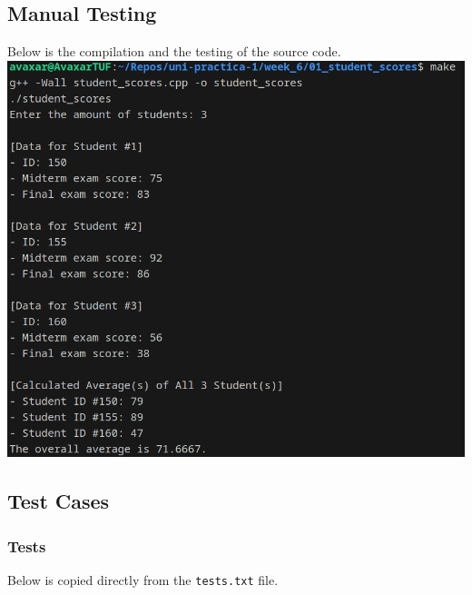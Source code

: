 \documentclass[12pt]{article}
\begin{document}
\subsection{Manual Testing}
Below is the compilation and the testing of the source code.
\newline\includegraphics[width=\textwidth]{01_student_scores}

\pagebreak
\subsection{Test Cases}

\subsubsection{Tests}
Below is copied directly from the \texttt{tests.txt} file.
\inputminted{text}{01_student_scores/tests.txt}
\end{document}

